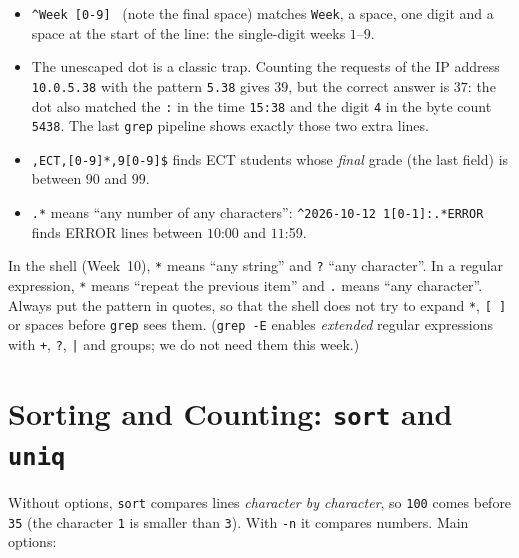 \documentclass[11pt,a4paper]{article}
\newcommand{\cmd}[1]{\texttt{#1}}
\begin{document}
\begin{itemize}
  \item \texttt{\textasciicircum Week [0-9] } (note the final space) matches \texttt{Week}, a space, one digit and a space at the start of the line: the single-digit weeks $1$--$9$.
  \item The unescaped dot is a classic trap. Counting the requests of the IP address \texttt{10.0.5.38} with the pattern \texttt{5.38} gives $39$, but the correct answer is $37$: the dot also matched the \texttt{:} in the time \texttt{15:38} and the digit \texttt{4} in the byte count \texttt{5438}. The last \cmd{grep} pipeline shows exactly those two extra lines.
  \item \texttt{,ECT,[0-9]*,9[0-9]\$} finds ECT students whose \emph{final} grade (the last field) is between $90$ and $99$.
  \item \texttt{.*} means ``any number of any characters'': \texttt{\textasciicircum 2026-10-12 1[0-1]:.*ERROR} finds ERROR lines between $10$:00 and $11$:59.
\end{itemize}

\begin{keyidea}
In the shell (Week~10), \texttt{*} means ``any string'' and \texttt{?} ``any character''. In a regular expression, \texttt{*} means ``repeat the previous item'' and \texttt{.} means ``any character''. Always put the pattern in quotes, so that the shell does not try to expand \texttt{*}, \texttt{[ ]} or spaces before \cmd{grep} sees them. (\cmd{grep -E} enables \emph{extended} regular expressions with \texttt{+}, \texttt{?}, \texttt{|} and groups; we do not need them this week.)
\end{keyidea}

\section{Sorting and Counting: \texttt{sort} and \texttt{uniq}}
\label{sec:sort}



Without options, \cmd{sort} compares lines \emph{character by character}, so \texttt{100} comes before \texttt{35} (the character \texttt{1} is smaller than \texttt{3}). With \cmd{-n} it compares numbers. Main options:
\end{document}
